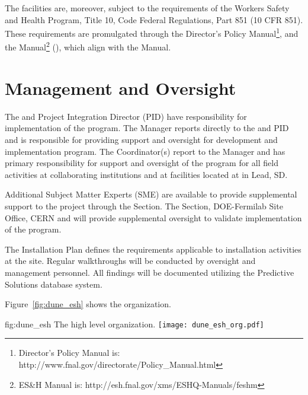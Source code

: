 The \fnal facilities are, moreover, subject to the requirements of the
 Workers Safety and Health Program, Title 10, Code Federal
Regulations, Part 851 (10 CFR 851). These requirements are
promulgated through the \fnal Director's Policy Manual\footnote{\fnal
  Director's Policy Manual is:
  http://www.fnal.gov/directorate/Policy\_Manual.html}, and the \fnal
{} Manual\footnote{\fnal ES\&H Manual is:
  http://esh.fnal.gov/xms/ESHQ-Manuals/feshm} (), which align with
the \surf {} Manual.


\section{  Management and Oversight}

The  and Project Integration Director
(PID) have responsibility for implementation of the 
 program.  The   Manager
reports directly to the  and PID and is responsible for
providing  support and oversight for development and implementation
  program. The   Coordinator(s) report to the  
Manager and has primary responsibility for  support and oversight
of the   program for all field activities at collaborating
institutions and at  facilities located at \surf in Lead, SD.

Additional  Subject Matter Experts (SME) are available to provide
supplemental support to the project through the \fnal {}
Section. The \fnal {} Section, DOE-Fermilab Site Office, CERN and
\surf will provide supplemental  oversight to validate
implementation of the    program.

The  Installation  Plan 
defines the  requirements applicable to 
installation activities at the \surf site. Regular  walkthroughs
will be conducted by   oversight and management personnel. All
findings will be documented utilizing the \fnal Predictive
Solutions database system.

Figure~\ref{fig:dune_esh} shows the   organization.
\begin{dunefigure}{fig:dune_esh}
  {The high level   organization.}
  \texttt{[image: dune\_esh\_org.pdf]}
\end{dunefigure}




